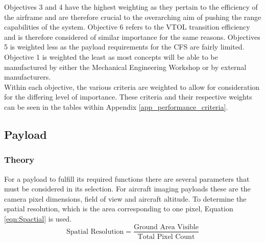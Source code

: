 Objectives 3 and 4 have the highest weighting as they pertain to the efficiency of the airframe and are therefore crucial to the overarching aim of pushing the range capabilities of the system. Objective 6 refers to the VTOL transition efficiency and is therefore considered of similar importance for the same reasons. Objectives 5 is weighted less as the payload requirements for the CFS are fairly limited. Objective 1 is weighted the least as most concepts will be able to be manufactured by either the Mechanical Engineering Workshop or by external manufacturers.\\

Within each objective, the various criteria are weighted to allow for consideration for the differing level of importance. These criteria and their respective weights can be seen in the tables within Appendix \ref{app_performance_criteria}.



\clearpage




\clearpage



\clearpage


\subsection{Payload}
\label{payload}
\subsubsection{Theory} 
For a payload to fulfill its required functions there are several parameters that must be considered in its selection. For aircraft imaging payloads these are the camera pixel dimensions, field of view and aircraft altitude. To determine the spatial resolution, which is the area corresponding to one pixel, Equation \ref{eqn:Spactial} is used.\\
\begin{equation}
    \text{Spatial Resolution} = \frac{\text{Ground Area Visible}}{\text{Total Pixel Count}} \label{eqn:Spactial}
\end{equation}

